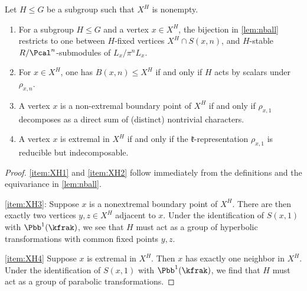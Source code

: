 \documentclass{amsart}
\begin{document}
	\begin{lemma}\label{lem:XH}
		Let $H \leq G$ be a subgroup such that $X^{H}$ is nonempty.
		\begin{enumerate}
			\item\label{item:XH1} For a subgroup $H\leq G$ and a vertex $x\in X^{H}$, the bijection in \cref{lem:nball} restricts to one between $H$-fixed vertices $X^{H}\cap S(x,n)$, and  $H$-stable $R/\Pcal^{n}$-submodules of $L_{x}/\pi^{n}L_{x}$.
			\item\label{item:XH2} For $x\in X^{H}$, one has $B(x,n) \leq X^{H}$ if and only if $H$ acts by scalars under $\rho_{x,n}$.
			\item\label{item:XH3} A vertex $x$ is a non-extremal boundary point of $X^{H}$ if and only if $\rho_{x,1}$ decomposes as a direct sum of (distinct) nontrivial characters.
			\item\label{item:XH4} A vertex $x$ is extremal in $X^{H}$ if and only if the $\mathfrak{k}$-representation $\rho_{x,1}$ is reducible but indecomposable.
		\end{enumerate}
	\end{lemma}
	\begin{proof}
		\cref{item:XH1} and \cref{item:XH2} follow immediately from the definitions and the equivariance in \cref{lem:nball}.
		
		\cref{item:XH3}: Suppose $x$ is a nonextremal boundary point of $X^{H}$. There are then exactly two vertices $y,z \in X^{H}$ adjacent to $x$. Under the identification of $S(x,1)$ with $\Pbb^{1}(\kfrak)$, we see that $H$ must act as a group of hyperbolic transformations with common fixed points $y,z$.
		
		\cref{item:XH4} Suppose $x$ is extremal in $X^{H}$. Then $x$ has exactly one neighbor in $X^{H}$. Under the identification of $S(x,1)$ with $\Pbb^{1}(\kfrak)$, we find that $H$ must act as a group of parabolic transformations.
	\end{proof}
	
\end{document}
